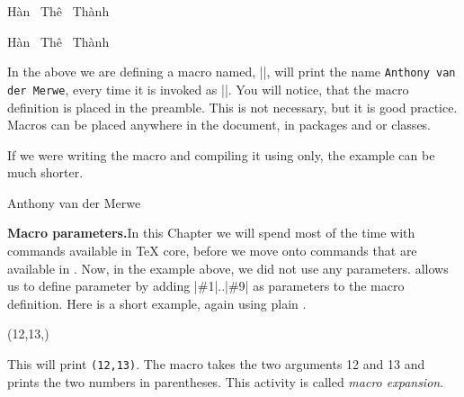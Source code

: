 \def\Thanh{%
      H\`an~%
      \texorpdfstring{Th\^e\llap{\raise 0.5ex\hbox{\'{}}}}%
      {\ifpdfstringuni teX   {Th}{Th\^e}}%
      ~Th\`anh%
    }

\Thanh 
\Thanh %

\begin{multicols}{2}
In the above we are defining a macro named, |\myshortcut|, will print the name \texttt{Anthony van der Merwe}, every time it is invoked as |\myshortcut|. You will notice, that the macro definition is placed in the preamble. This is not necessary, but it is good practice. Macros can be placed anywhere in the document, in packages and or classes.

If we were writing the macro and compiling it using \tex only, the example can be much shorter.
\end{multicols}

\begin{teXXX}
\def\myshortcut{Anthony van der Merwe}
\myshortcut
\bye
\end{teXXX}


\begin{multicols}{2}
\textbf{Macro parameters.}\quad In this Chapter we will spend most of the time with commands available in TeX core, before we move onto commands that are available in \latex. Now, in the example above, we did not use any parameters. \tex allows us to define parameter by adding |\#1|..|\#9| as parameters to the macro definition. Here is a short example, again using plain \tex. 
\end{multicols}
\begin{teXXX}
\def\twonumbers#1#2{(#1,#2)} 
\twonumbers{12,13}
\bye
\end{teXXX}

\def\twonumbers#1#2{(#1,#2)}

This will print \texttt{\twonumbers{12}{13}}. The macro takes the two arguments 12 and 13  and prints the two numbers in parentheses. This activity is called \textit{macro expansion}.
 
